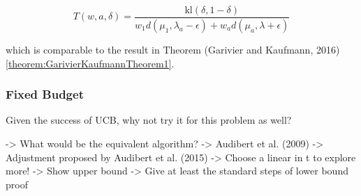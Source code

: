 \documentclass[12pt,]{article}
\begin{document}
\begin{equation}
T(w, a, \delta) = \frac{\text{kl}(\delta, 1-\delta)}{w_1 d(\mu_1, \lambda_a - \epsilon) + w_a d(\mu_a, \lambda + \epsilon)}
\end{equation}

which is comparable to the result in Theorem (Garivier and Kaufmann,
2016) \ref{theorem:GarivierKaufmannTheorem1}.

\subsubsection{Fixed Budget}\label{fixed-budget}

Given the success of UCB, why not try it for this problem as well?

-\textgreater{} What would be the equivalent algorithm? -\textgreater{}
Audibert et al. (2009) -\textgreater{} Adjustment proposed by Audibert
et al. (2015) -\textgreater{} Choose a linear in t to explore more!
-\textgreater{} Show upper bound -\textgreater{} Give at least the
standard steps of lower bound proof
\end{document}
